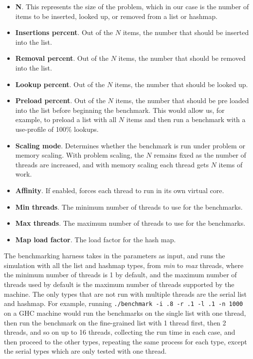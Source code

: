 \documentclass[11pt]{article}
\begin{document}
\begin{itemize}
\item
{\bf N}. This represents the size of the problem, which in our case is the
number of items to be inserted, looked up, or removed from a list or hashmap.
\item
{\bf Insertions percent}. Out of the $N$ items, the number that should be
inserted into the list.
\item
{\bf Removal percent}. Out of the $N$ items, the number that should be removed
into the list.
\item
{\bf Lookup percent}. Out of the $N$ items, the number that should be looked up.
\item
{\bf Preload percent}. Out of the $N$ items, the number that should be pre
loaded into the list before beginning the benchmark. This would allow us, for
example, to preload a list with all $N$ items and then run a benchmark with a
use-profile of 100\% lookups.
\item
{\bf Scaling mode}. Determines whether the benchmark is run under problem or
memory scaling. With problem scaling, the $N$ remains fixed as the number of
threads are increased, and with memory scaling each thread gets $N$ items of
work.
\item
{\bf Affinity}. If enabled, forces each thread to run in its own virtual core.
\item
{\bf Min threads}. The minimum number of threads to use for the benchmarks.
\item
{\bf Max threads}. The maximum number of threads to use for the benchmarks.
\item
{\bf Map load factor}. The load factor for the hash map.
\end{itemize}

The benchmarking harness takes in the parameters as input, and runs the
simulation with all the list and hashmap types, from {\it min} to {\it max}
threads, where the minimum number of threads is 1 by default, and the maximum
number of threads used by default is the maximum number of threads supported by
the machine. The only types that are not run with multiple threads are the
serial list and hashmap. For example, running
{\tt ./benchmark -i .8 -r .1 -l .1 -n 1000} on a GHC machine would run the
benchmarks on the single list with one thread, then run the benchmark on the
fine-grained list with 1 thread first, then 2 threads, and so on up to 16
threads, collecting the run time in each case, and then proceed to the other
types, repeating the same process for each type, except the serial types which
are only tested with one thread.
\end{document}
